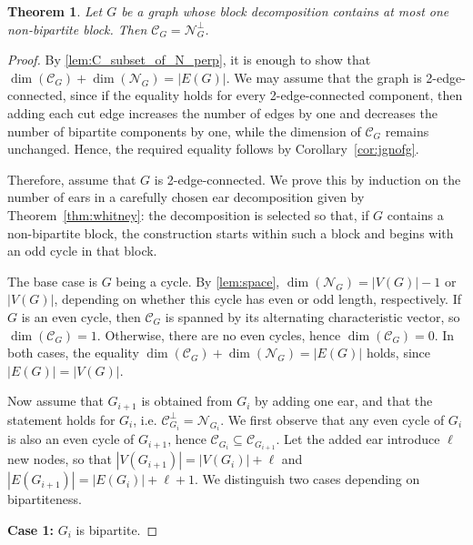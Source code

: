 \documentclass{article}
\theoremstyle{plain}
\newtheorem{thm}{Theorem}[section]
\theoremstyle{definition}
\newcommand{\cC}{\mathcal{C}}
\newcommand{\cN}{\mathcal{N}}
\begin{document}
\begin{thm}\label{thm:ear_decomposition_main}
    Let $G$ be a graph whose block decomposition contains at most one non-bipartite block. Then $\cC_G = \cN_G^{\perp}$.
\end{thm}
\begin{proof}
    By \cref{lem:C_subset_of_N_perp}, it is enough to show that $\dim(\mathcal{C}_G) + \dim(\mathcal{N}_G) = |E(G)|$. We may assume that the graph is 2-edge-connected, since if the equality holds for every 2-edge-connected component, then adding each cut edge increases the number of edges by one and decreases the number of bipartite components by one, while the dimension of $\mathcal{C}_G$ remains unchanged. Hence, the required equality follows by Corollary~\ref{cor:jgnofg}.
    
    Therefore, assume that $G$ is 2-edge-connected. We prove this by induction on the number of ears in a carefully chosen ear decomposition given by Theorem~\ref{thm:whitney}: the decomposition is selected so that, if $G$ contains a non-bipartite block, the construction starts within such a block and begins with an odd cycle in that block.

    The base case is $G$ being a cycle. By \cref{lem:space}, $\dim(\cN_G) = |V(G)|-1$ or $|V(G)|$, depending on whether this cycle has even or odd length, respectively. If $G$ is an even cycle, then $\cC_G$ is spanned by its alternating characteristic vector, so $\dim(\cC_G)=1$. Otherwise, there are no even cycles, hence $\dim(\cC_G)=0$. In both cases, the equality $\dim(\cC_G) + \dim(\cN_G) = |E(G)|$ holds, since $|E(G)|=|V(G)|$.
    
    Now assume that $G_{i+1}$ is obtained from $G_i$ by adding one ear, and that the statement holds for $G_i$, i.e. $\cC_{G_i}^{\perp} = \cN_{G_i}$. We first observe that any even cycle of $G_i$ is also an even cycle of $G_{i+1}$, hence $\cC_{G_i} \subseteq \cC_{G_{i+1}}$. Let the added ear introduce $\ell$ new nodes, so that
    $|V(G_{i+1})| = |V(G_i)| + \ell$ and $|E(G_{i+1})| = |E(G_i)| + \ell + 1$. We distinguish two cases depending on bipartiteness.
    \medskip
    
    \noindent\textbf{Case 1:} $G_i$ is bipartite.
    

\end{proof}
\end{document}
